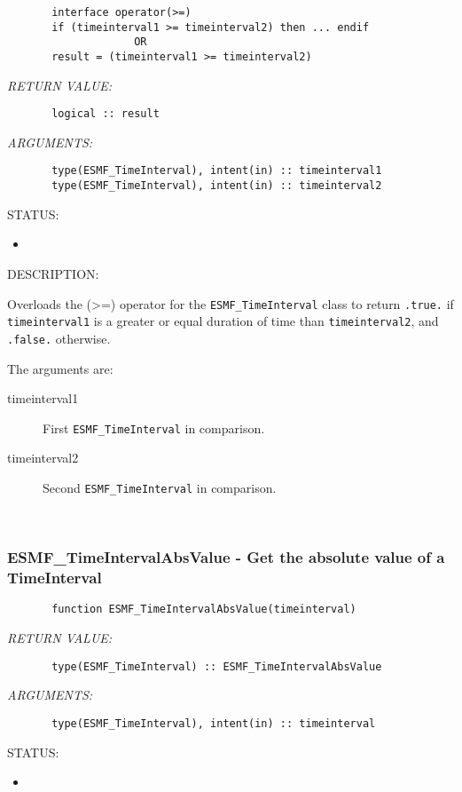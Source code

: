   
\begin{verbatim}       interface operator(>=)
       if (timeinterval1 >= timeinterval2) then ... endif
                    OR
       result = (timeinterval1 >= timeinterval2)\end{verbatim}{\em RETURN VALUE:}
\begin{verbatim}       logical :: result\end{verbatim}{\em ARGUMENTS:}
\begin{verbatim}       type(ESMF_TimeInterval), intent(in) :: timeinterval1
       type(ESMF_TimeInterval), intent(in) :: timeinterval2\end{verbatim}
{\sf STATUS:}
   \begin{itemize}
   \item{}
   \end{itemize}
  
{\sf DESCRIPTION:\\ }


       Overloads the (>=) operator for the {\tt ESMF\_TimeInterval} class to
       return {\tt .true.} if {\tt timeinterval1} is a greater or equal 
       duration of time than {\tt timeinterval2}, and {\tt .false.} otherwise.
  
       The arguments are:
       \begin{description}
       \item[timeinterval1]
            First {\tt ESMF\_TimeInterval} in comparison.
       \item[timeinterval2]
            Second {\tt ESMF\_TimeInterval} in comparison.
       \end{description}
    
 
\mbox{}\hrulefill\ 
 
\subsubsection [ESMF\_TimeIntervalAbsValue] {ESMF\_TimeIntervalAbsValue - Get the absolute value of a TimeInterval}


 
\begin{verbatim}       function ESMF_TimeIntervalAbsValue(timeinterval)
 \end{verbatim}{\em RETURN VALUE:}
\begin{verbatim}       type(ESMF_TimeInterval) :: ESMF_TimeIntervalAbsValue
 \end{verbatim}{\em ARGUMENTS:}
\begin{verbatim}       type(ESMF_TimeInterval), intent(in) :: timeinterval
 \end{verbatim}
{\sf STATUS:}
   \begin{itemize}
   \item{}
   \end{itemize}
  
